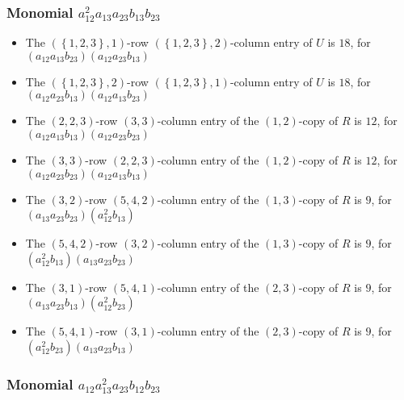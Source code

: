 \documentclass{article}
\begin{document}
\subsubsection{Monomial $ a_{12}^{2} a_{13} a_{23} b_{13} b_{23} $}

\begin{itemize}
\item The $ \left(\left\{1, 2, 3\right\}, 1\right) $-row $ \left(\left\{1, 2, 3\right\}, 2\right) $-column entry of $U$ is $ 18 $, for $( a_{12} a_{13} b_{23} )( a_{12} a_{23} b_{13} )$ 
\item The $ \left(\left\{1, 2, 3\right\}, 2\right) $-row $ \left(\left\{1, 2, 3\right\}, 1\right) $-column entry of $U$ is $ 18 $, for $( a_{12} a_{23} b_{13} )( a_{12} a_{13} b_{23} )$ 
\item The $(2, 2, 3)$-row $(3, 3)$-column entry of the $ \left(1, 2\right) $-copy of $R$ is $ 12 $, for $( a_{12} a_{13} b_{13} )( a_{12} a_{23} b_{23} )$ 
\item The $(3, 3)$-row $(2, 2, 3)$-column entry of the $ \left(1, 2\right) $-copy of $R$ is $ 12 $, for $( a_{12} a_{23} b_{23} )( a_{12} a_{13} b_{13} )$ 
\item The $(3, 2)$-row $(5, 4, 2)$-column entry of the $ \left(1, 3\right) $-copy of $R$ is $ 9 $, for $( a_{13} a_{23} b_{23} )( a_{12}^{2} b_{13} )$ 
\item The $(5, 4, 2)$-row $(3, 2)$-column entry of the $ \left(1, 3\right) $-copy of $R$ is $ 9 $, for $( a_{12}^{2} b_{13} )( a_{13} a_{23} b_{23} )$ 
\item The $(3, 1)$-row $(5, 4, 1)$-column entry of the $ \left(2, 3\right) $-copy of $R$ is $ 9 $, for $( a_{13} a_{23} b_{13} )( a_{12}^{2} b_{23} )$ 
\item The $(5, 4, 1)$-row $(3, 1)$-column entry of the $ \left(2, 3\right) $-copy of $R$ is $ 9 $, for $( a_{12}^{2} b_{23} )( a_{13} a_{23} b_{13} )$ 
\end{itemize}
\subsubsection{Monomial $ a_{12} a_{13}^{2} a_{23} b_{12} b_{23} $}
\end{document}

